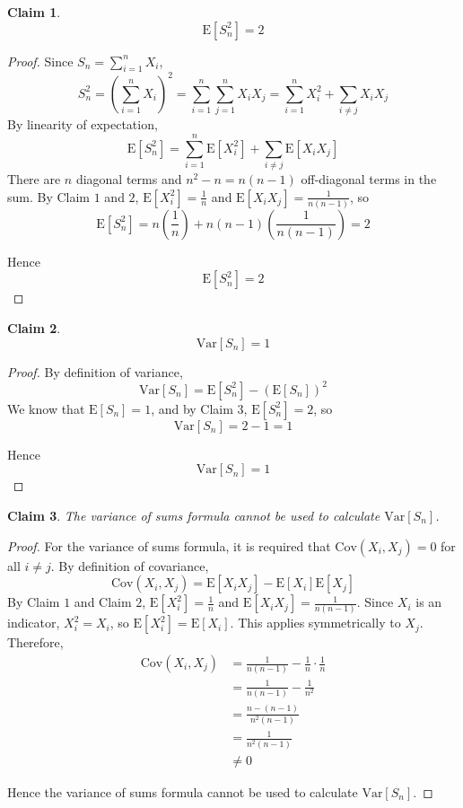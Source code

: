 \documentclass{article}
\newtheorem{claim}{Claim}
\begin{document}
\begin{claim}
    \[
    \mathrm{E}[S_n^2] = 2
    \]
\end{claim}

\begin{proof}
    Since $S_n = \sum_{i=1}^n X_i$,
    \[
    S_n^2 = \left(\sum_{i=1}^n X_i\right)^2 = \sum_{i=1}^{n}\sum_{j=1}^{n} X_iX_j 
    = \sum_{i=1}^{n} X_i^2 + \sum_{i \neq j} X_iX_j
    \]
    By linearity of expectation, 
    \[
    \mathrm{E}[S_n^2] = \sum_{i=1}^{n}\mathrm{E}[X_i^2] + \sum_{i \neq j}\mathrm{E}[X_iX_j]
    \]
    There are $n$ diagonal terms and $n^2 - n = n(n-1)$ off-diagonal terms in the sum. By Claim $1$ and 
    $2$, $\mathrm{E}[X_i^2] = \frac{1}{n}$ and $\mathrm{E}[X_iX_j] = \frac{1}{n(n-1)}$, so
    \[
    \mathrm{E}[S_n^2] = n\left(\frac{1}{n}\right) + n(n-1)\left(\frac{1}{n(n-1)}\right) = 2
    \]

    \medskip

    Hence 
    \[
    \mathrm{E}[S_n^2] = 2
    \]
\end{proof}

\begin{claim}
    \[
    \mathrm{Var}[S_n] = 1
    \]
\end{claim}

\begin{proof}
    By definition of variance,
    \[
    \mathrm{Var}[S_n] = \mathrm{E}[S_n^2] - (\mathrm{E}[S_n])^2
    \]
    We know that $\mathrm{E}[S_n] = 1$, and by Claim $3$, $\mathrm{E}[S_n^2] = 2$, so 
    \[
    \mathrm{Var}[S_n] = 2 - 1 = 1
    \]

    \medskip

    Hence
    \[
    \mathrm{Var}[S_n] = 1
    \]
\end{proof}

\begin{claim}
    The variance of sums formula cannot be used to calculate $\mathrm{Var}[S_n]$.
\end{claim}

\begin{proof}
    For the variance of sums formula, it is required that $\mathrm{Cov}(X_i, X_j) = 0$ for all 
    $i \neq j$. By definition of covariance,
    \[
    \mathrm{Cov}(X_i, X_j) = \mathrm{E}[X_iX_j] - \mathrm{E}[X_i]\mathrm{E}[X_j]
    \]
    By Claim $1$ and Claim $2$, $\mathrm{E}[X_i^2] = \frac{1}{n}$ and 
    $\mathrm{E}[X_iX_j] = \frac{1}{n(n-1)}$. Since $X_i$ is an indicator, $X_i^2 = X_i$, so 
    $\mathrm{E}[X_i^2] = \mathrm{E}[X_i]$. This applies symmetrically to $X_j$. Therefore,
    \[
    \begin{aligned}
        \mathrm{Cov}(X_i, X_j) &= \frac{1}{n(n-1)} - \frac{1}{n} \cdot \frac{1}{n} \\
        &= \frac{1}{n(n-1)} - \frac{1}{n^2} \\
        &= \frac{n - (n-1)}{n^2(n-1)} \\
        &= \frac{1}{n^2(n-1)} \\
        &\neq 0
    \end{aligned}
    \]

    \medskip

    Hence the variance of sums formula cannot be used to calculate $\mathrm{Var}[S_n]$.
\end{proof}
\end{document}
